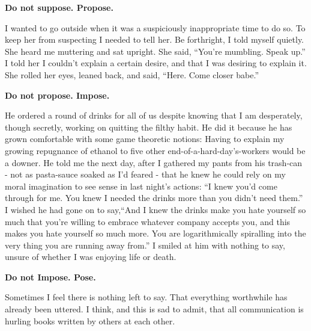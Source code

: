 \documentclass{article}
\begin{document}
\newline

\textbf{Do not suppose. Propose.}
\newline

I wanted to go outside when it was a suspiciously inappropriate time to
do so. To keep her from suspecting I needed to tell her. Be forthright,
I told myself quietly. She heard me muttering and sat upright. She
said, ``You're mumbling. Speak up.'' I told her I couldn't explain
a certain desire, and that I was desiring to explain it. She rolled her
eyes, leaned back, and said, ``Here. Come closer babe.'' \newline
\newline

\textbf{Do not propose. Impose.}
\newline

He ordered a round of drinks for all of us despite knowing that I am
desperately, though secretly, working on quitting the filthy habit. He
did it because he has grown comfortable with some game theoretic
notions: Having to explain my growing repugnance of ethanol to five
other end-of-a-hard-day's-workers would be a downer. He told me the next
day, after I gathered my pants from his trash-can - not as pasta-sauce
soaked as I'd feared - that he knew he could rely on my moral
imagination to see sense in last night's actions: ``I knew you'd come
through for me. You knew I needed the drinks more than you didn't need
them.'' I wished he had gone on to say,``And I knew the drinks make you
hate yourself so much that you're willing to embrace whatever company
accepts you, and this makes you hate yourself so much more. You are
logarithmically spiralling into the very thing you are running away
from.'' I smiled at him with nothing to say, unsure of whether I was
enjoying life or death. \newline \newline


\textbf{Do not Impose. Pose.}
\newline

Sometimes I feel there is nothing left to say. That everything
worthwhile has already been uttered. I think, and this is sad to admit,
that all communication is hurling books written by others at each
other.\newline \newline
\end{document}
